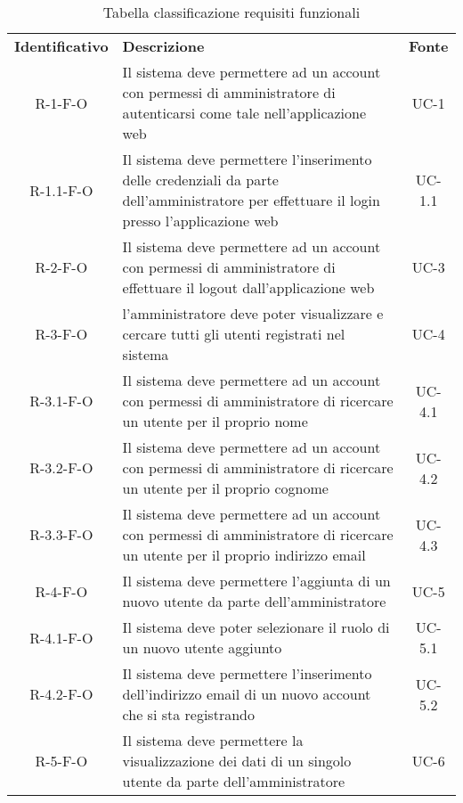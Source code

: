 \renewcommand{\arraystretch}{1.5}
\begin{longtable}{ c C{9.5cm} c }
    \caption{Tabella classificazione requisiti funzionali}\\
    \rowcolor{\primaryColor}
    \textcolor{\secondaryColor}{
    \textbf{Identificativo}} & \textcolor{\secondaryColor}{\textbf{Descrizione}}                                                            & \textcolor{\secondaryColor}
    {\textbf{Fonte}}                                                                                                                                                      \\


    R-1-F-O & Il sistema deve permettere ad un account con permessi di amministratore di autenticarsi come tale nell'applicazione web& UC-1 \\
    R-1.1-F-O & Il sistema deve permettere l'inserimento delle credenziali da parte dell'amministratore per effettuare il login presso l'applicazione web& UC-1.1 \\
    R-2-F-O & Il sistema deve permettere ad un account con permessi di amministratore di effettuare il logout dall'applicazione web& UC-3 \\
    R-3-F-O & l'amministratore deve poter visualizzare e cercare tutti gli utenti registrati nel sistema& UC-4 \\
    R-3.1-F-O & Il sistema deve permettere ad un account con permessi di amministratore di ricercare un utente per il proprio nome& UC-4.1 \\
    R-3.2-F-O & Il sistema deve permettere ad un account con permessi di amministratore di ricercare un utente per il proprio cognome& UC-4.2 \\
    R-3.3-F-O & Il sistema deve permettere ad un account con permessi di amministratore di ricercare un utente per il proprio indirizzo email& UC-4.3 \\
    R-4-F-O & Il sistema deve permettere l'aggiunta di un nuovo utente da parte dell'amministratore& UC-5 \\
    R-4.1-F-O & Il sistema deve poter selezionare il ruolo di un nuovo utente aggiunto& UC-5.1 \\
    R-4.2-F-O & Il sistema deve permettere l'inserimento dell'indirizzo email di un nuovo account che si sta registrando& UC-5.2 \\
    R-5-F-O & Il sistema deve permettere la visualizzazione dei dati di un singolo utente da parte dell'amministratore& UC-6 \\

\end{longtable}
